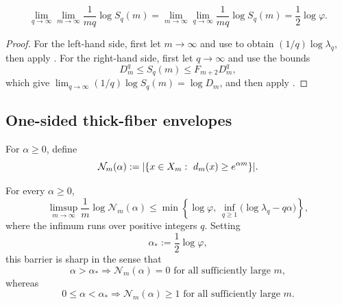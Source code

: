 \begin{corollary}
\label{cor:double-limit}
\[
  \lim_{q\to\infty}\lim_{m\to\infty}\frac{1}{m q}\log S_q(m)
  =
  \lim_{m\to\infty}\lim_{q\to\infty}\frac{1}{m q}\log S_q(m)
  =
  \frac12\log\varphi.
\]
\end{corollary}

\begin{proof}
For the left-hand side, first let \(m\to\infty\) and use
 to obtain \((1/q)\log \lambda_q\), then apply
.  For the right-hand side, first let \(q\to\infty\)
and use the bounds
\[
  D_m^q\le S_q(m)\le F_{m+2}D_m^q,
\]
which give \(\lim_{q\to\infty} (1/q)\log S_q(m)=\log D_m\), and then apply
.
\end{proof}

\subsection{One-sided thick-fiber envelopes}

\begin{definition}
\label{def:thick-fibers}
For \(\alpha\ge 0\), define
\[
  \mathcal N_m(\alpha)
  :=
  \lvert \{x\in X_m:\ d_m(x)\ge e^{\alpha m}\} \rvert.
\]
\end{definition}

\begin{corollary}
\label{cor:thick-fiber-envelope}
For every \(\alpha\ge 0\),
\[
  \limsup_{m\to\infty}\frac{1}{m}\log \mathcal N_m(\alpha)
  \le
  \min\left\{
    \log\varphi,\,
    \inf_{q\ge 1}\bigl(\log \lambda_q-q\alpha\bigr)
  \right\},
\]
where the infimum runs over positive integers \(q\).  Setting
\[
  \alpha_\ast:=\frac12\log\varphi,
\]
this barrier is sharp in the sense that
\[
  \alpha>\alpha_\ast
  \Longrightarrow
  \mathcal N_m(\alpha)=0 \text{ for all sufficiently large }m,
\]
whereas
\[
  0\le \alpha<\alpha_\ast
  \Longrightarrow
  \mathcal N_m(\alpha)\ge 1 \text{ for all sufficiently large }m.
\]
\end{corollary}

